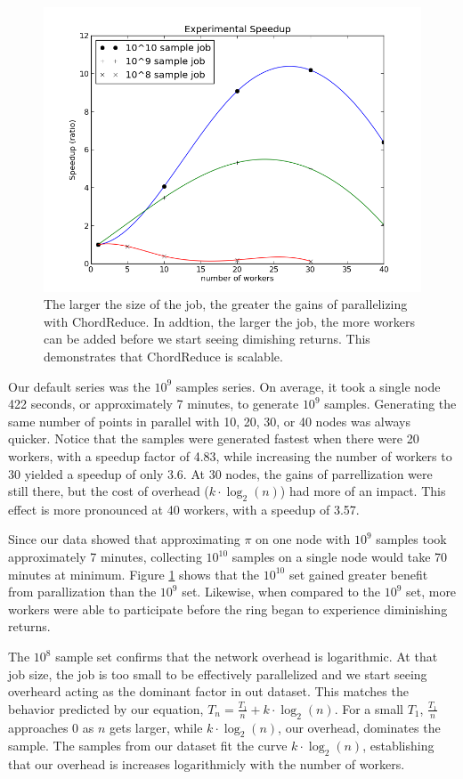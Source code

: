 \documentclass[10pt, conference, compsocconf]{IEEEtran}
\begin{document}
\begin{figure}
    \includegraphics[width=\linewidth]{expSpeed}
    \caption{The larger the size of the job, the greater the gains of parallelizing with ChordReduce.  In addtion, the larger the job, the more workers can be added before we start seeing dimishing returns.  This demonstrates that ChordReduce is scalable.}
    \label{expSpeed}
\end{figure}
Our default series was the $10^{9}$ samples series.  On average, it took a single node 422 seconds, or approximately 7 minutes, to generate $10^{9}$ samples.  Generating the same number of points in parallel with 10, 20, 30, or 40 nodes was always quicker.  Notice that the samples were generated fastest when there were 20 workers, with a speedup factor of 4.83, while increasing the number of workers to 30 yielded a speedup of only 3.6.  At 30 nodes, the gains of parrellization were still there, but the cost of overhead ($k \cdot \log_{2}(n)$) had more of an impact.  This effect is more pronounced at 40 workers, with a speedup of 3.57.

Since our data showed that approximating $\pi$ on one node with $10^{9}$ samples took approximately 7 minutes, collecting $10^{10}$ samples on a single node would take 70 minutes at minimum.  Figure \ref{expSpeed} shows that the $10^{10}$ set gained greater benefit from parallization than the $10^{9}$ set.  Likewise, when compared to the $10^{9}$ set, more workers were able to participate before the ring began to experience diminishing returns.

The $10^{8}$ sample set confirms that the network overhead is logarithmic.  At that job size, the job is too small to be effectively parallelized and we start seeing overheard acting as the dominant factor in out dataset.  This matches the behavior predicted by our equation, $T_{n} = \frac{T_{1}}{n} + k \cdot \log_{2}(n)$. For a small $T_{1}$, $\frac{T_{1}}{n}$  approaches 0 as $n$ gets larger, while $k \cdot \log_{2}(n)$, our overhead, dominates the sample.  The samples from our dataset fit the curve $k \cdot \log_{2}(n)$, establishing that our overhead is increases logarithmicly with the number of workers.
\end{document}
